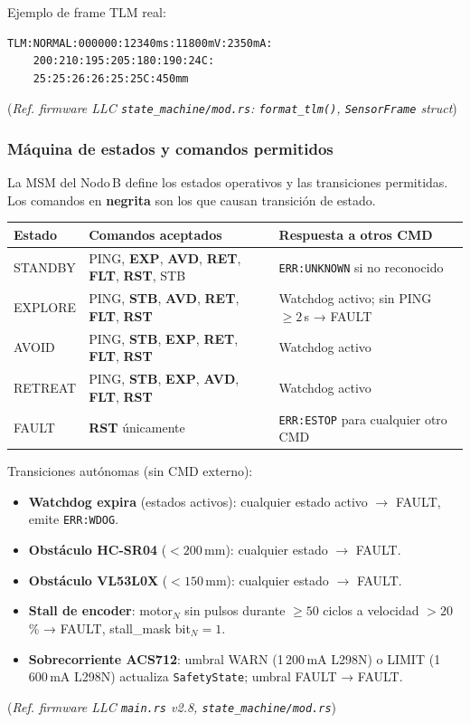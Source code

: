 Ejemplo de frame TLM real:
\begin{verbatim}
TLM:NORMAL:000000:12340ms:11800mV:2350mA:
    200:210:195:205:180:190:24C:
    25:25:26:26:25:25C:450mm
\end{verbatim}
(\emph{Ref. firmware LLC \texttt{state\_machine/mod.rs}: \texttt{format\_tlm()}, \texttt{SensorFrame} struct})

\subsubsection{Máquina de estados y comandos permitidos}

La MSM del Nodo\,B define los estados operativos y las transiciones
permitidas. Los comandos en \textbf{negrita} son los que causan
transición de estado.

\begin{center}
\small
\renewcommand{\arraystretch}{1.3}
\begin{tabular}{lp{4.5cm}p{5.0cm}}
\toprule
\textbf{Estado} & \textbf{Comandos aceptados} & \textbf{Respuesta a otros CMD} \\
\midrule
STANDBY &
  PING, \textbf{EXP}, \textbf{AVD}, \textbf{RET}, \textbf{FLT}, \textbf{RST}, STB &
  \verb|ERR:UNKNOWN| si no reconocido \\
EXPLORE &
  PING, \textbf{STB}, \textbf{AVD}, \textbf{RET}, \textbf{FLT}, \textbf{RST} &
  Watchdog activo; sin PING $\geq 2$\,s → FAULT \\
AVOID   &
  PING, \textbf{STB}, \textbf{EXP}, \textbf{RET}, \textbf{FLT}, \textbf{RST} &
  Watchdog activo \\
RETREAT &
  PING, \textbf{STB}, \textbf{EXP}, \textbf{AVD}, \textbf{FLT}, \textbf{RST} &
  Watchdog activo \\
FAULT   &
  \textbf{RST} únicamente &
  \verb|ERR:ESTOP| para cualquier otro CMD \\
\bottomrule
\end{tabular}
\end{center}

Transiciones autónomas (sin CMD externo):
\begin{itemize}
  \item \textbf{Watchdog expira} (estados activos): cualquier estado activo $\rightarrow$ FAULT,
        emite \verb|ERR:WDOG|.
  \item \textbf{Obstáculo HC-SR04} ($< 200$\,mm): cualquier estado $\rightarrow$ FAULT.
  \item \textbf{Obstáculo VL53L0X} ($< 150$\,mm): cualquier estado $\rightarrow$ FAULT.
  \item \textbf{Stall de encoder}: motor$_N$ sin pulsos durante $\geq 50$ ciclos a
        velocidad $> 20$\,\% → FAULT, stall\_mask bit$_N = 1$.
  \item \textbf{Sobrecorriente ACS712}: umbral WARN (1\,200\,mA L298N) o
        LIMIT (1\,600\,mA L298N) actualiza \verb|SafetyState|; umbral FAULT → FAULT.
\end{itemize}
(\emph{Ref. firmware LLC \texttt{main.rs} v2.8, \texttt{state\_machine/mod.rs}})

